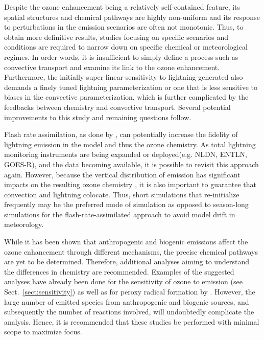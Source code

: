 Despite the ozone enhancement being a relatively self-contained feature, its spatial structures
and chemical pathways are highly non-uniform and its response to perturbations in the emission
scenarios are often not monotonic. Thus, to obtain more definitive results, studies
focusing on specific scenarios and conditions are required to narrow down on specific chemical
or meteorological regimes. In order words, it is insufficient to simply define a process such as
convective transport and examine its link to the ozone enhancement. Furthermore, the initially
super-linear sensitivity to lightning-generated  also demands a finely tuned lightning
parameterization or one that is less sensitive to biases in the convective parameterization, which
is further complicated by the feedbacks between chemistry and convective transport. Several
potential improvements to this study and remaining questions follow.

Flash rate assimilation, as done by \citet{Cooper:2009nx}, can potentially
increase the fidelity of lightning  emission in the model and thus the ozone chemistry.
As total lightning monitoring instruments are being expanded or deployed(e.g. NLDN, ENTLN, GOES-R), and the
data becoming available, it is possible to revisit this approach again. However, because the vertical
distribution of {\lnox} emission has significant impacts on the resulting ozone chemistry
\citep{Pickering:1998sh}, it is also important to guarantee that convection and lightning colocate.
Thus, short simulations that re-initialize frequently may be the preferred mode of simulation as
opposed to season-long simulations for the flash-rate-assimilated approach to avoid model drift in meteorology.

While it has been shown that anthropogenic and biogenic emissions affect the ozone
enhancement through different mechanisms, the precise chemical pathways are yet to be
determined. Therefore, additional analyses aiming to understand the
differences in chemistry are recommended. Examples of the suggested analyses have already
been done for the sensitivity of ozone to {\lnox} emission (see Sect.~\ref{sect:sensitivity})
as well as for peroxy radical formation by \citet{Barth:2012qf}. However, the large number of
emitted species from anthropogenic and biogenic sources, and subsequently the number of
reactions involved, will undoubtedly complicate the analysis. Hence, it is recommended that
these studies be performed with minimal scope to maximize focus.